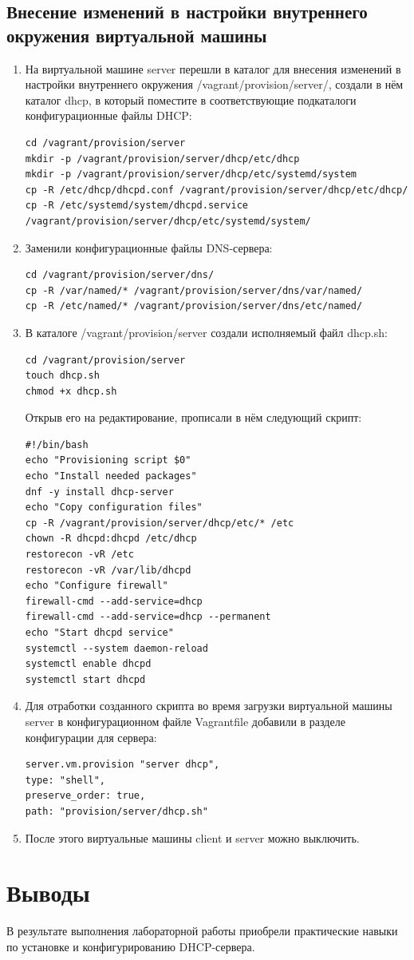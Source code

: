 \subsection{Внесение изменений в настройки внутреннего окружения
виртуальной машины}
\begin{enumerate}
\item На виртуальной машине server перешли в каталог для внесения изменений в настройки внутреннего окружения /vagrant/provision/server/, создали в нём каталог dhcp, в который поместите в соответствующие подкаталоги конфигурационные файлы DHCP:
    \begin{verbatim}
cd /vagrant/provision/server
mkdir -p /vagrant/provision/server/dhcp/etc/dhcp
mkdir -p /vagrant/provision/server/dhcp/etc/systemd/system
cp -R /etc/dhcp/dhcpd.conf /vagrant/provision/server/dhcp/etc/dhcp/
cp -R /etc/systemd/system/dhcpd.service /vagrant/provision/server/dhcp/etc/systemd/system/
    \end{verbatim}
\item Заменили конфигурационные файлы DNS-сервера:
    \begin{verbatim}
cd /vagrant/provision/server/dns/
cp -R /var/named/* /vagrant/provision/server/dns/var/named/
cp -R /etc/named/* /vagrant/provision/server/dns/etc/named/
    \end{verbatim}
\item В каталоге /vagrant/provision/server создали исполняемый файл dhcp.sh:
    \begin{verbatim}
cd /vagrant/provision/server
touch dhcp.sh
chmod +x dhcp.sh
    \end{verbatim}
Открыв его на редактирование, прописали в нём следующий скрипт:
    \begin{verbatim}
#!/bin/bash
echo "Provisioning script $0"
echo "Install needed packages"
dnf -y install dhcp-server
echo "Copy configuration files"
cp -R /vagrant/provision/server/dhcp/etc/* /etc
chown -R dhcpd:dhcpd /etc/dhcp
restorecon -vR /etc
restorecon -vR /var/lib/dhcpd
echo "Configure firewall"
firewall-cmd --add-service=dhcp
firewall-cmd --add-service=dhcp --permanent
echo "Start dhcpd service"
systemctl --system daemon-reload
systemctl enable dhcpd
systemctl start dhcpd
    \end{verbatim}
\item Для отработки созданного скрипта во время загрузки виртуальной машины server в конфигурационном файле Vagrantfile добавили в разделе конфигурации для сервера:
    \begin{verbatim}
server.vm.provision "server dhcp",
type: "shell",
preserve_order: true,
path: "provision/server/dhcp.sh"
    \end{verbatim}
\item После этого виртуальные машины client и server можно выключить.
\end{enumerate}

\section{Выводы}
В результате выполнения лабораторной работы приобрели практические навыки по установке и конфигурированию DHCP-сервера.


